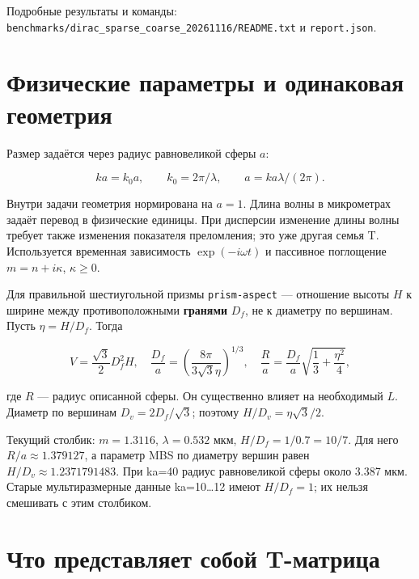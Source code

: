 \documentclass[
  russian,
  11pt,
  a4paper,
]{report}
\begin{document}
Подробные результаты и команды:
\nolinkurl{benchmarks/dirac_sparse_coarse_20261116/README.txt} и
\nolinkurl{report.json}.

\chapter{Физические параметры и одинаковая
геометрия}\label{ux444ux438ux437ux438ux447ux435ux441ux43aux438ux435-ux43fux430ux440ux430ux43cux435ux442ux440ux44b-ux438-ux43eux434ux438ux43dux430ux43aux43eux432ux430ux44f-ux433ux435ux43eux43cux435ux442ux440ux438ux44f}

Размер задаётся через радиус равновеликой сферы \(a\):

\[ka=k_0a,\qquad k_0=2\pi/\lambda,\qquad a=ka\lambda/(2\pi).\]

Внутри задачи геометрия нормирована на \(a=1\). Длина волны в
микрометрах задаёт перевод в физические единицы. При дисперсии изменение
длины волны требует также изменения показателя преломления; это уже
другая семья T. Используется временная зависимость \(\exp(-i\omega t)\)
и пассивное поглощение \(m=n+i\kappa\), \(\kappa\geq0\).

Для правильной шестиугольной призмы \nolinkurl{prism-aspect} ---
отношение высоты \(H\) к ширине между противоположными \textbf{гранями}
\(D_f\), не к диаметру по вершинам. Пусть \(\eta=H/D_f\). Тогда

\[V=\frac{\sqrt3}{2}D_f^2H,\quad
\frac{D_f}{a}=\left(\frac{8\pi}{3\sqrt3\eta}\right)^{1/3},\quad
\frac{R}{a}=\frac{D_f}{a}\sqrt{\frac13+\frac{\eta^2}{4}},\]

где \(R\) --- радиус описанной сферы. Он существенно влияет на
необходимый \(L\). Диаметр по вершинам \(D_v=2D_f/\sqrt3\); поэтому
\(H/D_v=\eta\sqrt3/2\).

Текущий столбик: \(m=1.3116\), \(\lambda=0.532\) мкм,
\(H/D_f=1/0.7=10/7\). Для него \(R/a\approx1.379127\), а параметр MBS по
диаметру вершин равен \(H/D_v\approx1.2371791483\). При ka=40 радиус
равновеликой сферы около 3.387 мкм. Старые мультиразмерные данные
ka=10\ldots12 имеют \textbf{\(H/D_f=1\)}; их нельзя смешивать с этим
столбиком.

\chapter{Что представляет собой
T-матрица}\label{ux447ux442ux43e-ux43fux440ux435ux434ux441ux442ux430ux432ux43bux44fux435ux442-ux441ux43eux431ux43eux439-t-ux43cux430ux442ux440ux438ux446ux430}
\end{document}
